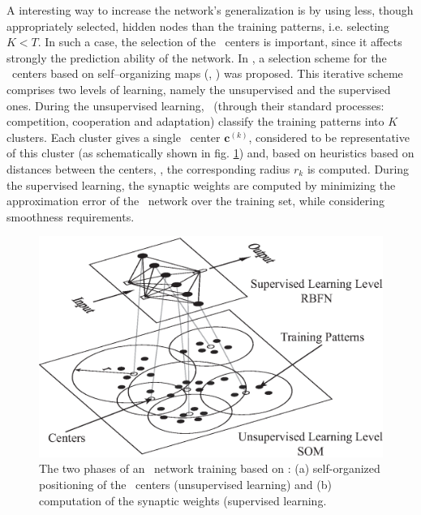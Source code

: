 \documentclass{vki_ls}
\newcommand{\vect}[1]{\bm{#1}}
\begin{document}
%
A interesting way to increase the network's generalization \cite{Pog1990, Tik76, Tik95} is by using less, though appropriately selected, hidden nodes than the training patterns, i.e. selecting $K\!<\!T$. 
In such a case, the selection of the \RBF\ centers is important, since 
it affects strongly the prediction ability of the network. 
In \cite{LTT_2_029}, a selection scheme for the \RBF\ centers based on 
self--organizing maps (\SOMs, \cite{Fri94a, Hayk1999}) was proposed. 
This iterative scheme comprises two levels of learning, namely the unsupervised and the supervised ones.
During the unsupervised learning, \SOMs\ (through their standard processes: 
competition, cooperation and adaptation) classify the training 
patterns into $K$ clusters.  
Each cluster gives a single \RBF\ center $\vect{c}^{(k)}$, considered to be representative of this cluster (as schematically shown in fig. \ref{f:rbfn-som}) and, based on heuristics based on distances between the centers, \cite{Karay1997, LTT_2_029, Hayk1999, BenArc02}, the corresponding radius $r_k$ is computed.
During the supervised learning, the synaptic weights are computed by minimizing the approximation error of the \RBF\ network over the training set, while considering smoothness requirements.
%
\begin{figure}
    \centering
    \includegraphics[scale=0.6]{rbf-som.eps}
    \caption{The two phases of an \RBF\ network training based on \SOMs:
            (a) self-organized positioning of the \RBF\ centers (unsupervised 
            learning) and (b) computation of the synaptic weights (supervised
            learning.}
    \label{f:rbfn-som}
\end{figure}
\end{document}
